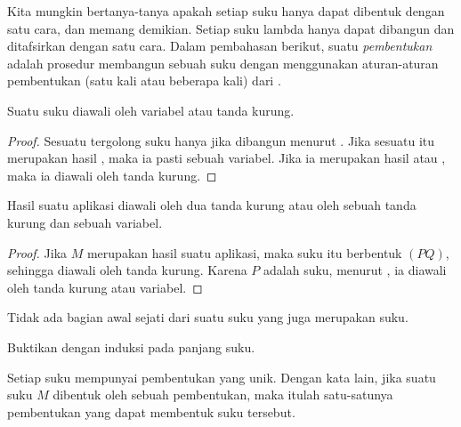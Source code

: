 \documentclass[../../../include/open-logic-section]{subfiles}
\begin{document}

Kita mungkin bertanya-tanya apakah setiap suku hanya dapat dibentuk dengan
satu cara, dan memang demikian. Setiap suku lambda hanya dapat dibangun dan
ditafsirkan dengan satu cara. Dalam pembahasan berikut, suatu
\emph{pembentukan} adalah prosedur membangun sebuah suku dengan menggunakan
aturan-aturan pembentukan (satu kali atau beberapa kali) dari
.

\begin{lem}
Suatu suku diawali oleh variabel atau tanda kurung.
\end{lem}

\begin{proof}
Sesuatu tergolong suku hanya jika dibangun menurut
. Jika sesuatu itu merupakan hasil
, maka ia pasti sebuah variabel. Jika ia merupakan
hasil  atau , maka ia
diawali oleh tanda kurung.
\end{proof}

\begin{lem}
Hasil suatu aplikasi diawali oleh dua tanda kurung atau oleh sebuah tanda
kurung dan sebuah variabel.
\end{lem}

\begin{proof}
Jika $M$ merupakan hasil suatu aplikasi, maka suku itu berbentuk $(PQ)$,
sehingga diawali oleh tanda kurung. Karena $P$ adalah suku, menurut
, ia diawali oleh tanda kurung atau variabel.
\end{proof}

\begin{lem}
Tidak ada bagian awal sejati dari suatu suku yang juga merupakan suku.
\end{lem}

\begin{prob}
Buktikan  dengan induksi pada panjang suku.
\end{prob}

\begin{prop} 
Setiap suku mempunyai pembentukan yang unik. Dengan kata lain, jika suatu suku
$M$ dibentuk oleh sebuah pembentukan, maka itulah satu-satunya pembentukan yang
dapat membentuk suku tersebut.
\end{prop}
\end{document}
